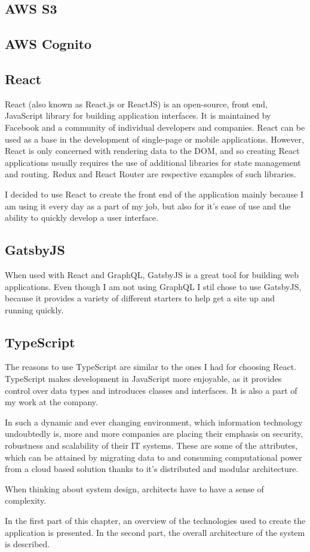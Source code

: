 \documentclass[12pt,oneside]{fithesis2}
\begin{document}
    \subsection*{AWS S3}
    \subsection*{AWS Cognito}
    \subsection*{React}
    React (also known as React.js or ReactJS) is an open-source, front end, JavaScript library for building application interfaces. It is maintained by Facebook and a community of individual developers and companies. React can be used as a base in the development of single-page or mobile applications. However, React is only concerned with rendering data to the DOM, and so creating React applications usually requires the use of additional libraries for state management and routing. Redux and React Router are respective examples of such libraries.
    \par
    I decided to use React to create the front end of the application mainly because I am using it every day as a part of my job, but also for it's ease of use and the ability to quickly develop a user interface.
    \subsection*{GatsbyJS}
    When used with React and GraphQL, GatsbyJS is a great tool for building web applications. Even though I am not using GraphQL I stil chose to use GatsbyJS, because it provides a variety of different starters to help get a site up and running quickly.
    \subsection*{TypeScript}
    The reasons to use TypeScript are similar to the ones I had for choosing React. TypeScript makes development in JavaScript more enjoyable, as it provides control over data types and introduces classes and interfaces. It is also a part of my work at the company.
    
    In such a dynamic and ever changing environment, which information technology undoubtedly is, more and more companies are placing their emphasis on security, robustness and scalability of their IT systems. These are some of the attributes, which can be attained by migrating data to and consuming computational power from a cloud based solution thanks to it's distributed and modular architecture.
    \par
    When thinking about system design, architects have to have a sense of complexity.
    \par
    In the first part of this chapter, an overview of the technologies used to create the application is presented. In the second part, the overall architecture of the system is described.
\end{document}
